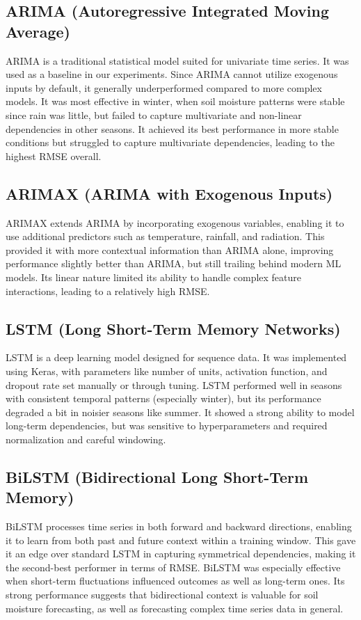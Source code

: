 \documentclass{article}
\begin{document}
\subsection{ARIMA (Autoregressive Integrated Moving Average)}
ARIMA is a traditional statistical model suited for univariate time series. It was used as a baseline in our experiments. Since ARIMA cannot utilize exogenous inputs by default, it generally underperformed compared to more complex models. It was most effective in winter, when soil moisture patterns were stable since rain was little, but failed to capture multivariate and non-linear dependencies in other seasons. It achieved its best performance in more stable conditions but struggled to capture multivariate dependencies, leading to the highest RMSE overall.

\subsection{ARIMAX (ARIMA with Exogenous Inputs)}
ARIMAX extends ARIMA by incorporating exogenous variables, enabling it to use additional predictors such as temperature, rainfall, and radiation. This provided it with more contextual information than ARIMA alone, improving performance slightly better than ARIMA, but still trailing behind modern ML models. Its linear nature limited its ability to handle complex feature interactions, leading to a relatively high RMSE.

\subsection{LSTM (Long Short-Term Memory Networks)}
LSTM is a deep learning model designed for sequence data. It was implemented using Keras, with parameters like number of units, activation function, and dropout rate set manually or through tuning. LSTM performed well in seasons with consistent temporal patterns (especially winter), but its performance degraded a bit in noisier seasons like summer. It showed a strong ability to model long-term dependencies, but was sensitive to hyperparameters and required normalization and careful windowing.

\subsection{BiLSTM (Bidirectional Long Short-Term Memory)}
BiLSTM processes time series in both forward and backward directions, enabling it to learn from both past and future context within a training window. This gave it an edge over standard LSTM in capturing symmetrical dependencies, making it the second-best performer in terms of RMSE. BiLSTM was especially effective when short-term fluctuations influenced outcomes as well as long-term ones. Its strong performance suggests that bidirectional context is valuable for soil moisture forecasting, as well as forecasting complex time series data in general.
\end{document}
